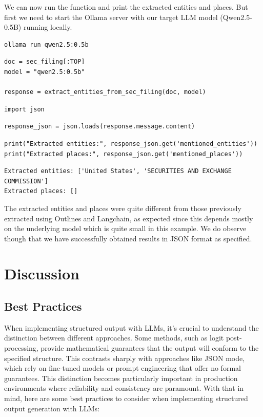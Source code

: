 We can now run the function and print the extracted entities and places. But first we need to start the Ollama server with our target LLM model (Qwen2.5-0.5B) running locally.

\begin{verbatim}
ollama run qwen2.5:0.5b
\end{verbatim}

\begin{verbatim}
doc = sec_filing[:TOP]
model = "qwen2.5:0.5b"

response = extract_entities_from_sec_filing(doc, model)
\end{verbatim}

\begin{verbatim}
import json
\end{verbatim}

\begin{verbatim}
response_json = json.loads(response.message.content)
\end{verbatim}

\begin{verbatim}
print("Extracted entities:", response_json.get('mentioned_entities'))
print("Extracted places:", response_json.get('mentioned_places'))
\end{verbatim}

\begin{verbatim}
Extracted entities: ['United States', 'SECURITIES AND EXCHANGE COMMISSION']
Extracted places: []
\end{verbatim}

The extracted entities and places were quite different from those previously extracted using Outlines and Langchain, as expected since this depends mostly on the underlying model which is quite small in this example. We do observe though that we have successfully obtained results in JSON format as specified.

\section{Discussion}

\subsection{Best Practices}

When implementing structured output with LLMs, it's crucial to understand the distinction between different approaches. Some methods, such as logit post-processing, provide mathematical guarantees that the output will conform to the specified structure. This contrasts sharply with approaches like JSON mode, which rely on fine-tuned models or prompt engineering that offer no formal guarantees. This distinction becomes particularly important in production environments where reliability and consistency are paramount. With that in mind, here are some best practices to consider when implementing structured output generation with LLMs:


